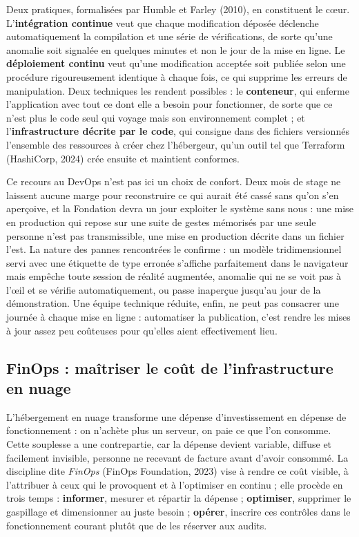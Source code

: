 Deux pratiques, formalisées par Humble et Farley (2010), en constituent le cœur.
L'\textbf{intégration continue} veut que chaque modification déposée déclenche
automatiquement la compilation et une série de vérifications, de sorte qu'une
anomalie soit signalée en quelques minutes et non le jour de la mise en ligne.
Le \textbf{déploiement continu} veut qu'une modification acceptée soit publiée
selon une procédure rigoureusement identique à chaque fois, ce qui supprime les
erreurs de manipulation. Deux techniques les rendent possibles : le
\textbf{conteneur}, qui enferme l'application avec tout ce dont elle a besoin
pour fonctionner, de sorte que ce n'est plus le code seul qui voyage mais son
environnement complet ; et l'\textbf{infrastructure décrite par le code}, qui
consigne dans des fichiers versionnés l'ensemble des ressources à créer chez
l'hébergeur, qu'un outil tel que Terraform (HashiCorp, 2024) crée ensuite et
maintient conformes.

Ce recours au DevOps n'est pas ici un choix de confort. Deux mois de stage ne
laissent aucune marge pour reconstruire ce qui aurait été cassé sans qu'on s'en
aperçoive, et la Fondation devra un jour exploiter le système sans nous : une
mise en production qui repose sur une suite de gestes mémorisés par une seule
personne n'est pas transmissible, une mise en production décrite dans un fichier
l'est. La nature des pannes rencontrées le confirme : un modèle tridimensionnel
servi avec une étiquette de type erronée s'affiche parfaitement dans le
navigateur mais empêche toute session de réalité augmentée, anomalie qui ne se
voit pas à l'œil et se vérifie automatiquement, ou passe inaperçue jusqu'au jour
de la démonstration. Une équipe technique réduite, enfin, ne peut pas consacrer
une journée à chaque mise en ligne : automatiser la publication, c'est rendre
les mises à jour assez peu coûteuses pour qu'elles aient effectivement lieu.

\subsection{FinOps : maîtriser le coût de l'infrastructure en nuage}

L'hébergement en nuage transforme une dépense d'investissement en dépense de
fonctionnement : on n'achète plus un serveur, on paie ce que l'on consomme.
Cette souplesse a une contrepartie, car la dépense devient variable, diffuse et
facilement invisible, personne ne recevant de facture avant d'avoir consommé. La
discipline dite \emph{FinOps} (FinOps Foundation, 2023) vise à rendre ce coût
visible, à l'attribuer à ceux qui le provoquent et à l'optimiser en continu ;
elle procède en trois temps : \textbf{informer}, mesurer et répartir la dépense ;
\textbf{optimiser}, supprimer le gaspillage et dimensionner au juste besoin ;
\textbf{opérer}, inscrire ces contrôles dans le fonctionnement courant plutôt
que de les réserver aux audits.

